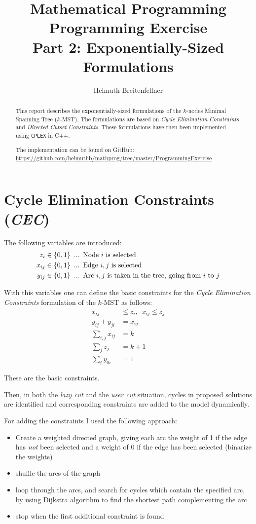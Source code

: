 \documentclass[11pt, oneside, a4paper, fleqn]{article}
\author{Helmuth Breitenfellner}
\title{Mathematical Programming\\
       Programming Exercise\\
       Part 2: Exponentially-Sized Formulations}
\date{}
\begin{document}
\maketitle
\begin{abstract}
This report describes the exponentially-sized
formulations of the $k$-nodes Minimal Spanning Tree ($k$-MST).
The formulations are based on \textit{Cycle Elimination Constraints}
and \textit{Directed Cutset Constraints}.
These formulations have then been implemented using \texttt{CPLEX}
in C++.

The implementation can be found on GitHub:\\
\url{https://github.com/helmuthb/mathprog/tree/master/ProgrammingExercise}

\end{abstract}

\section*{Cycle Elimination Constraints (\emph{CEC})}

The following variables are introduced:
\begin{align*}
  z_i \in\{0,1\} & \enskip ... \enskip \text{Node $i$ is selected}\\
  x_{ij} \in\{0,1\} & \enskip ... \enskip\text{Edge $i,j$ is selected}\\
  y_{ij} \in\{0,1\} & \enskip ... \enskip\text{Arc $i,j$ is taken
             in the tree, going from $i$ to $j$}
\end{align*}

With this variables one can define the basic constraints for
the \emph{Cycle Elimination Constraints} formulation of
the $k$-MST as follows:
\begin{align}
  x_{ij} & \le z_i, \enspace x_{ij} \le z_j \\
  y_{ij} + y_{ji} & = x_{ij}\\
  \sum_{i,j}x_{ij} & = k \\
  \sum_{j} z_j & = k + 1 \\
  \sum_{i} y_{0i} & = 1
\end{align}

These are the basic constraints.

Then, in both the \emph{lazy cut} and the \emph{user cut}
situation, cycles in proposed solutions are identified
and corresponding constraints are added to the model dynamically.

For adding the constraints I used the following approach:
\begin{itemize}
\item Create a weighted directed graph, giving each arc the weight
of 1 if the edge has \emph{not} been selected and a weight of 0
if the edge has been selected (binarize the weights)
\item shuffle the arcs of the graph
\item loop through the arcs, and search for cycles which contain
the specified arc, by using Dijkstra algorithm to find
the shortest path complementing the arc
\item stop when the first additional constraint is found
\end{itemize}
\end{document}
